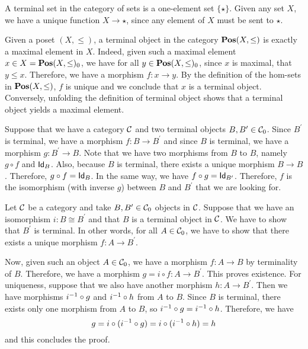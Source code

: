 \begin{solution}\label{sol:terminal_set}
	A terminal set in the category of sets is a one-element set $ \{ \star \} $. Given any set $ X $, we have a unique function $ X \to \star $, since any element of $ X $ must be sent to $ \star $.
\end{solution}

\begin{solution}\label{sol:terminal_posetcat}
	Given a poset $ (X, \leq) $, a terminal object in the category $ \POS(X, \leq) $ is exactly a maximal element in $ X $. Indeed, given such a maximal element $ x \in X = \POS(X, \leq)_0 $, we have for all $ y \in \POS(X, \leq)_0 $, since $ x $ is maximal, that $ y \leq x $. Therefore, we have a morphism $ f: x \to y $. By the definition of the hom-sets in $ \POS(X, \leq) $, $ f $ is unique and we conclude that $ x $ is a terminal object.
	Conversely, unfolding the definition of terminal object shows that a terminal object yields a maximal element.
\end{solution}

\begin{solution}\label{sol:terminal-unique}
	Suppose that we have a category $ \CC $ and two terminal objects $ B, B^\prime \in \Ob\CC $. Since $ B^\prime $ is terminal, we have a morphism $ f: B \to B^\prime $ and since $ B $ is terminal, we have a morphism $ g: B^\prime \to B $. Note that we have two morphisms from $ B $ to $ B $, namely $ g \circ f $ and $ \Id[B] $. Also, because $ B $ is terminal, there exists a unique morphism $ B \to B $. Therefore, $ g \circ f = \Id[B] $. In the same way, we have $ f \circ g = \Id[B^\prime] $. Therefore, $ f $ is the isomorphism (with inverse $g$) between $ B $ and $ B^\prime $ that we are looking for.
\end{solution}

\begin{solution}\label{sol:terminality_preserved_by_iso}
	Let $ \CC $ be a category and take $ B, B^\prime \in \Ob\CC $ objects in $ \CC $. Suppose that we have an isomorphism $ i: B \cong B^\prime $ and that $ B $ is a terminal object in $ \CC $. We have to show that $ B^\prime $ is terminal. In other words, for all $ A \in \Ob\CC $, we have to show that there exists a unique morphism $ f: A \to B^\prime $.

	Now, given such an object $ A \in \Ob\CC $, we have a morphism $ f: A \to B $ by terminality of $ B $. Therefore, we have a morphism $ g = i \circ f: A \to B^\prime $. This proves existence. For uniqueness, suppose that we also have another morphism $ h: A \to B^\prime $. Then we have morphisms $ \Inv{i} \circ g $ and $ \Inv{i} \circ h $ from $ A $ to $ B $. Since $ B $ is terminal, there exists only one morphism from $ A $ to $ B $, so $ \Inv{i} \circ g = \Inv{i} \circ h $. Therefore, we have 
	\[ g = i \circ (\Inv{i} \circ g) = i \circ (\Inv i \circ h) = h \]
	and this concludes the proof.
\end{solution}

